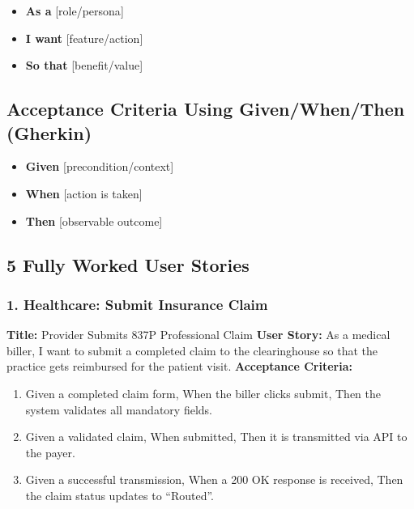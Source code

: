 \begin{itemize}
\tightlist
\item
  \textbf{As a} {[}role/persona{]}
\item
  \textbf{I want} {[}feature/action{]}
\item
  \textbf{So that} {[}benefit/value{]}
\end{itemize}

\subsection{Acceptance Criteria Using Given/When/Then
(Gherkin)}\label{acceptance-criteria-using-givenwhenthen-gherkin}

\begin{itemize}
\tightlist
\item
  \textbf{Given} {[}precondition/context{]}
\item
  \textbf{When} {[}action is taken{]}
\item
  \textbf{Then} {[}observable outcome{]}
\end{itemize}

\subsection{5 Fully Worked User
Stories}\label{fully-worked-user-stories}

\subsubsection{1. Healthcare: Submit Insurance
Claim}\label{healthcare-submit-insurance-claim}

\textbf{Title:} Provider Submits 837P Professional Claim \textbf{User
Story:} As a medical biller, I want to submit a completed claim to the
clearinghouse so that the practice gets reimbursed for the patient
visit. \textbf{Acceptance Criteria:}

\begin{enumerate}
\def\labelenumi{\arabic{enumi}.}
\tightlist
\item
  Given a completed claim form, When the biller clicks submit, Then the
  system validates all mandatory fields.
\item
  Given a validated claim, When submitted, Then it is transmitted via
  API to the payer.
\item
  Given a successful transmission, When a 200 OK response is received,
  Then the claim status updates to ``Routed''.
\end{enumerate}

